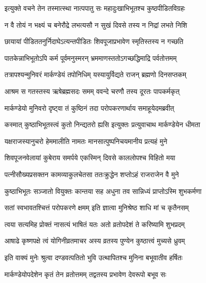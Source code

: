 \twolineshloka
{इत्युक्ते वचने तेन तस्मात्स्था नात्पपातु सः}
{महादुःखाभिभूतश्च कुष्ठपीडितविग्रहः} %

\twolineshloka
{न वै तोयं न भक्ष्यं च बनेरौद्रे लभत्यसौ}
{न सुखं दिवसे तस्य न निद्रां लभते निशि} %

\twolineshloka
{छायायां पीडिततनुर्निदाघेऽत्यन्तपीडितः}
{शिवपूजाप्रभावेण स्मृतिस्तस्य न गच्छति} %

\twolineshloka
{पातकेन्नाभिभूतोऽपि कर्म पूर्वमनुस्मरन्}
{भ्रममाणस्ततोऽगच्छद्धिमाद्रि पर्वतोत्तमम्} %

\twolineshloka
{तत्रापश्यन्मुनिवरं मार्कण्डेयं तपोनिधिम्}
{यस्यायुर्विद्यते राजन् ब्रह्मणो दिनसप्तकम्} %

\twolineshloka
{आश्रम स गतस्तस्य ऋषेब्रह्मसदः समम्}
{ववन्दे चरणौ तस्य दूरतः पापकर्मकृत्} %

\twolineshloka
{मार्कण्डेयो मुनिवरो दृष्ट्वा तं कुष्ठिनं तदा}
{परोपकरणार्थाय समाहूयेदमब्रवीत्} %


\twolineshloka
{कस्मात् कुष्ठाभिभूतस्त्वं कुतो निन्द्यतरो ह्यसि}
{इत्युक्तः प्रत्युवाचाथ मार्कण्डेयेन धीमता} %


\twolineshloka
{यक्षराजस्यानुचरो हेममालीति नामतः}
{मानसात्पुष्पनिचयमानीय प्रत्यहं मुने} %

\twolineshloka
{शिवपूजनवेलायां कुबेराय समर्पये}
{एकस्मिन् दिवसे काललोपश्च विहितो मया} %

\twolineshloka
{पत्नीसौख्यप्रसक्तन कामव्याकुलचेतसा}
{ततःक्रुद्धेन शप्तोऽहं राजराजेन वै मुने} %

\twolineshloka
{कुष्ठाभिभूतः सञ्जातो वियुक्तः कान्तया सह}
{अधुना तव सान्निध्यं प्राप्तोऽस्मि शुभकर्मणा} %

\twolineshloka
{सतां स्वभावतश्चित्तं परोपकरणे क्षमम्}
{इति ज्ञात्वा मुनिश्रेष्ठ शाधि मां च कृतैनसम्} %


\twolineshloka
{त्वया सत्यमिह प्रोक्तं नासत्यं भाषितं यतः}
{अतो व्रतोपदेशं ते करिष्यामि शुभप्रदम्} %

\twolineshloka
{आषाढे कृष्णपक्षे त्वं योगिनीव्रतमाचर}
{अस्य व्रतस्य पुण्येन कुष्ठात्त्वं मुच्यसे ध्रुवम्} %

\twolineshloka
{इति वाक्यं मुनेः श्रुत्वा दण्डवत्पतितो भुवि}
{उत्थापितश्च मुनिना बभूवातीव हर्षितः} %

\twolineshloka
{मार्कण्डेयोपदेशेन कृतं तेन व्रतोत्तमम्}
{तद्वतस्य प्रभावेण देवरूपो बभूव सः} %

